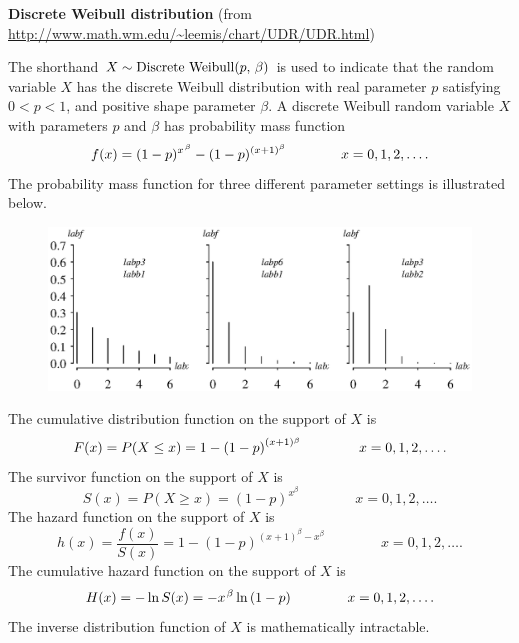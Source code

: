 \documentclass[12pt,fullpage]{article}
\begin{document}
\noindent
{\bf Discrete Weibull distribution} (from \color{blue}\url{http://www.math.wm.edu/~leemis/chart/UDR/UDR.html}\color{black})

\noindent
The shorthand $X \sim {\rm Discrete\ Weibull}(p,\, \beta)$ is used to indicate that the
random variable $X$ has the discrete Weibull distribution with real parameter $p$ satisfying $0 < p < 1$, and positive shape parameter $\beta$.
A discrete Weibull random variable $X$ with parameters $p$ and $\beta$ has probability mass function 
$$
f(x) = (1 - p) ^ {x ^ {\kern 0.08 em \beta}} - (1 - p) ^ {(x + 1) ^ {\beta}} \qquad \qquad x=0,1,2,\ldots .
$$
The probability mass function for three different parameter settings is illustrated below.

\begin{figure}[h!]
\begin{center}
\includegraphics[width=5.8in]{DiscreteweibullPlot.ps}
\end{center}
\end{figure}

\noindent
The cumulative distribution function on
the support of $X$ is
$$
F(x) = P(X \le x) = 1 - \left( 1 - p \right) ^ { \left( x + 1 \right) ^ {\mbox {{\tt}}_{{\beta}}}}  \qquad \qquad x=0,1,2,\ldots.
$$
The survivor function on the support of $X$ is
$$
S(x) = P(X \ge x) =  \left( 1 - p \right) ^ { x^ {\beta}}  \qquad \qquad x=0,1,2,\ldots.
$$
The hazard function on the support of $X$ is
$$
h(x) = \frac{f(x)} {S(x)} = 1 - \left( 1 - p \right) ^ {\left( x + 1 \right) ^ {\beta}- x^{\beta}} \qquad \qquad x=0,1,2,\ldots.
$$
The cumulative hazard function on the support of $X$ is
$$
H(x) = - \ln S(x) = -{x} ^ {\kern 0.08 em \beta} \ln  \left( 1 - p \right)  \qquad \qquad x=0,1,2,\ldots.
$$
The inverse distribution function of $X$ is mathematically intractable.

\vspace{0.1in}
\end{document}
